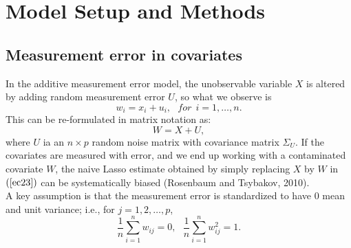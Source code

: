 \documentclass[a4paper,12pt,openany]{report}
\theoremstyle{plain}
\theoremstyle{plain}
\theoremstyle{plain}
\theoremstyle{plain}
\theoremstyle{plain}
\theoremstyle{plain}
\theoremstyle{plain}
\theoremstyle{plain}
\theoremstyle{plain}
\theoremstyle{plain}
\theoremstyle{plain}
\theoremstyle{plain}
\begin{document}
\chapter{Model Setup and Methods}

\section{Measurement error in covariates}

 In the additive measurement error model, the unobservable variable $X$ is altered by adding random measurement error $U$, so what we observe is
\begin{equation}
w_i=x_i+u_i,\ \ \ for \ \ i=1,\dots, n.
\end{equation} 
 This can be re-formulated in matrix notation as:
\begin{equation}
W = X + U,
\end{equation}
where $U$ ia an $n\times p$ random noise matrix with covariance matrix $\Sigma_U$. 
If the covariates are measured with error, and we end up working with a contaminated covariate $W$, the naive Lasso estimate obtained by simply replacing $X$ by $W$ in $(\ref{ec23})$ can be systematically biased (Rosenbaum and Tsybakov, 2010).\\

A key assumption is that the measurement error is standardized to have $0$ mean and unit variance; i.e., for $j=1,2,\ldots,p$,
\begin{equation}\label{eq:standardized}
\frac{1}{n}\sum_{i=1}^{n}w_{ij} = 0, \ \ \ \frac{1}{n}\sum_{i=1}^{n}w_{ij}^2 = 1. 
\end{equation}
\end{document}
